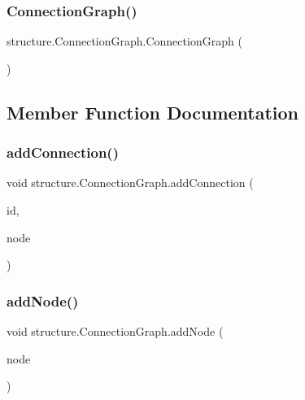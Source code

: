 \subsubsection{\texorpdfstring{Connection\+Graph()}{ConnectionGraph()}}
{\footnotesize\ttfamily structure.\+Connection\+Graph.\+Connection\+Graph (\begin{DoxyParamCaption}{ }\end{DoxyParamCaption})}



\subsection{Member Function Documentation}
\mbox{\label{classstructure_1_1_connection_graph_afc71ae9bd27880a4854fa69d8cbbebc3}} 
\subsubsection{\texorpdfstring{add\+Connection()}{addConnection()}}
{\footnotesize\ttfamily void structure.\+Connection\+Graph.\+add\+Connection (\begin{DoxyParamCaption}\item[{Integer}]{id,  }\item[{\hyperlink{classstructure_1_1_group_node}{Group\+Node}}]{node }\end{DoxyParamCaption})}

\mbox{\label{classstructure_1_1_connection_graph_aab26e85cf3048c1682a6552624d5436c}} 
\subsubsection{\texorpdfstring{add\+Node()}{addNode()}}
{\footnotesize\ttfamily void structure.\+Connection\+Graph.\+add\+Node (\begin{DoxyParamCaption}\item[{\hyperlink{classstructure_1_1_group_node}{Group\+Node}}]{node }\end{DoxyParamCaption})}

